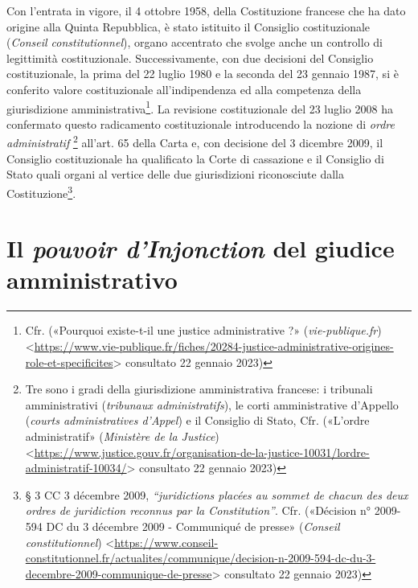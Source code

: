 \documentclass[12pt,it,a4paper,]{report}
\begin{document}
Con l'entrata in vigore, il 4 ottobre 1958, della Costituzione francese
che ha dato origine alla Quinta Repubblica, è stato istituito il
Consiglio costituzionale (\emph{Conseil constitutionnel}), organo
accentrato che svolge anche un controllo di legittimità costituzionale.
Successivamente, con due decisioni del Consiglio costituzionale, la
prima del 22 luglio 1980 e la seconda del 23 gennaio 1987, si è
conferito valore costituzionale all'indipendenza ed alla competenza
della giurisdizione amministrativa\footnote{Cfr. ({«Pourquoi existe-t-il
  une justice administrative ?»} (\emph{vie-publique.fr})
  \textless{}\url{https://www.vie-publique.fr/fiches/20284-justice-administrative-origines-role-et-specificites}\textgreater{}
  consultato 22 gennaio 2023)}. La revisione costituzionale del 23
luglio 2008 ha confermato questo radicamento costituzionale introducendo
la nozione di \emph{ordre administratif} \footnote{Tre sono i gradi
  della giurisdizione amministrativa francese: i tribunali
  amministrativi (\emph{tribunaux administratifs}), le corti
  amministrative d'Appello (\emph{courts administratives d'Appel}) e il
  Consiglio di Stato, Cfr. ({«L'ordre administratif»} (\emph{Ministère
  de la Justice})
  \textless{}\url{https://www.justice.gouv.fr/organisation-de-la-justice-10031/lordre-administratif-10034/}\textgreater{}
  consultato 22 gennaio 2023)} all'art. 65 della Carta e, con decisione
del 3 dicembre 2009, il Consiglio costituzionale ha qualificato la Corte
di cassazione e il Consiglio di Stato quali organi al vertice delle due
giurisdizioni riconosciute dalla Costituzione\footnote{§ 3 CC 3 décembre
  2009, \emph{``juridictions placées au sommet de chacun des deux ordres
  de juridiction reconnus par la Constitution''}. Cfr. ({«Décision n°
  2009-594 DC du 3 décembre 2009 - Communiqué de presse»} (\emph{Conseil
  constitutionnel})
  \textless{}\url{https://www.conseil-constitutionnel.fr/actualites/communique/decision-n-2009-594-dc-du-3-decembre-2009-communique-de-presse}\textgreater{}
  consultato 22 gennaio 2023)}.

\hypertarget{il-pouvoir-dinjonction-del-giudice-amministrativo}{%
\section{\texorpdfstring{Il \emph{pouvoir d'Injonction} del giudice
amministrativo}{Il pouvoir d'Injonction del giudice amministrativo}}\label{il-pouvoir-dinjonction-del-giudice-amministrativo}}
\end{document}
